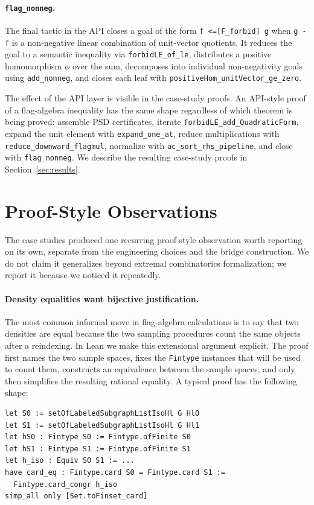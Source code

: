 \documentclass{article}
\newcommand{\lean}[1]{\texttt{#1}}
\begin{document}
\paragraph{\lean{flag\_nonneg}.}
The final tactic in the API closes a goal of the form
\lean{f <=[F\_forbid] g} when \lean{g - f} is a non-negative linear
combination of unit-vector quotients.  It reduces the goal to a semantic
inequality via \lean{forbidLE\_of\_le}, distributes a positive homomorphism
$\phi$ over the sum, decomposes into individual non-negativity goals using
\lean{add\_nonneg}, and closes each leaf with
\lean{positiveHom\_unitVector\_ge\_zero}.

The effect of the API layer is visible in the case-study proofs.  An
API-style proof of a flag-algebra inequality has the same shape regardless
of which theorem is being proved: assemble PSD certificates, iterate
\lean{forbidLE\_add\_QuadraticForm}, expand the unit element with
\lean{expand\_one\_at}, reduce multiplications with
\lean{reduce\_downward\_flagmul}, normalize with \lean{ac\_sort\_rhs\_pipeline},
and close with \lean{flag\_nonneg}.  We describe the resulting case-study
proofs in Section~\ref{sec:results}.


\section{Proof-Style Observations}
\label{sec:proof-style}

The case studies produced one recurring proof-style observation worth
reporting on its own, separate from the engineering choices and the bridge
construction.  We do not claim it generalizes beyond extremal combinatorics
formalization; we report it because we noticed it repeatedly.

\paragraph{Density equalities want bijective justification.}
The most common informal move in flag-algebra calculations is to say that
two densities are equal because the two sampling procedures count the same
objects after a reindexing.  In Lean we make this extensional argument
explicit.  The proof first names the two sample spaces, fixes the
\lean{Fintype} instances that will be used to count them, constructs an
equivalence between the sample spaces, and only then simplifies the resulting
rational equality.  A typical proof has the following shape:
\begin{lstlisting}
let S0 := setOfLabeledSubgraphListIsoHl G Hl0
let S1 := setOfLabeledSubgraphListIsoHl G Hl1
let hS0 : Fintype S0 := Fintype.ofFinite S0
let hS1 : Fintype S1 := Fintype.ofFinite S1
let h_iso : Equiv S0 S1 := ...
have card_eq : Fintype.card S0 = Fintype.card S1 :=
  Fintype.card_congr h_iso
simp_all only [Set.toFinset_card]
\end{lstlisting}
\end{document}
